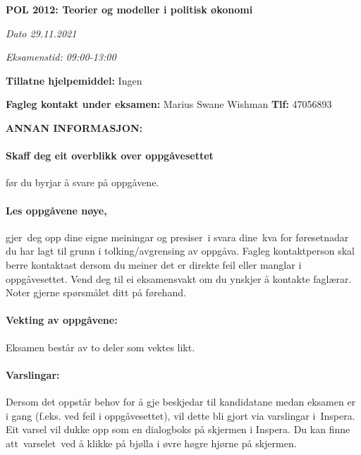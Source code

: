 \documentclass[a4paper,12pt,fleqn]{article}
\newcommand{\tittelhd}{POL 2012: Teorier og modeller i politisk økonomi}
\newcommand{\examdate}{29.11.2021}
\newcommand{\examtime}{09:00-13:00}
\begin{document}
\begin{center}
\large\textbf{\tittelhd}
\end{center}

\begin{center}
\textit{Dato \examdate}
\end{center}

\begin{center}
\textit{Eksamenstid: \examtime}
\end{center}

\vspace{.5cm}

\begin{center}
	\textbf{Tillatne hjelpemiddel:} Ingen
\end{center}

\begin{center}
	\textbf{Fagleg kontakt under eksamen:} Marius Swane Wishman
	\textbf{Tlf:} 47056893
\end{center}

\vspace{.5cm}

\begin{center}
	\textbf{ANNAN INFORMASJON:}
\end{center}

\paragraph{\textbf{Skaff deg eit overblikk over oppgåvesettet}} før du byrjar å
svare på oppgåvene.

\paragraph{\textbf{Les oppgåvene nøye,}} gjer deg opp dine eigne meiningar og
presiser i svara dine kva for føresetnadar du har lagt til grunn i
tolking/avgrensing av oppgåva. Fagleg kontaktperson skal berre kontaktast dersom
du meiner det er direkte feil eller manglar i oppgåvesettet. Vend deg til ei
eksamensvakt om du ynskjer å kontakte faglærar. Noter gjerne spørsmålet ditt på
førehand.

\paragraph{\textbf{Vekting av oppgåvene:}} Eksamen består av to deler som vektes
likt.

\paragraph{\textbf{Varslingar:}} Dersom det oppstår behov for å gje beskjedar
til kandidatane medan eksamen er i gang (f.eks. ved feil i oppgåvesettet), vil
dette bli gjort via varslingar i Inspera. Eit varsel vil dukke opp som en
dialogboks på skjermen i Inspera. Du kan finne att varselet ved å klikke på
bjølla i øvre høgre hjørne på skjermen. 
\end{document}

